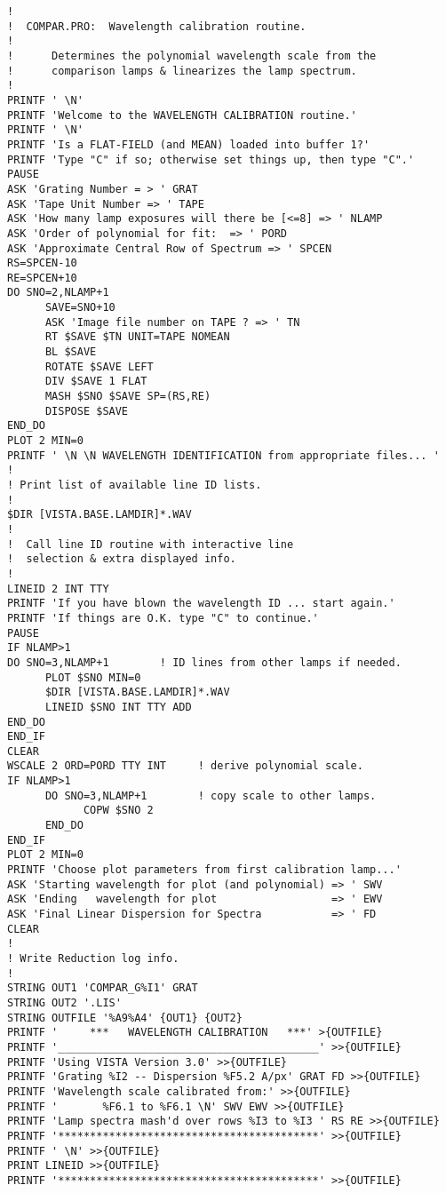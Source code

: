 \begin{verbatim}
!
!  COMPAR.PRO:  Wavelength calibration routine.
!
!      Determines the polynomial wavelength scale from the
!      comparison lamps & linearizes the lamp spectrum.
!
PRINTF ' \N'
PRINTF 'Welcome to the WAVELENGTH CALIBRATION routine.'
PRINTF ' \N'
PRINTF 'Is a FLAT-FIELD (and MEAN) loaded into buffer 1?'
PRINTF 'Type "C" if so; otherwise set things up, then type "C".'
PAUSE
ASK 'Grating Number = > ' GRAT
ASK 'Tape Unit Number => ' TAPE
ASK 'How many lamp exposures will there be [<=8] => ' NLAMP
ASK 'Order of polynomial for fit:  => ' PORD
ASK 'Approximate Central Row of Spectrum => ' SPCEN
RS=SPCEN-10
RE=SPCEN+10
DO SNO=2,NLAMP+1
      SAVE=SNO+10
      ASK 'Image file number on TAPE ? => ' TN
      RT $SAVE $TN UNIT=TAPE NOMEAN
      BL $SAVE
      ROTATE $SAVE LEFT
      DIV $SAVE 1 FLAT
      MASH $SNO $SAVE SP=(RS,RE)
      DISPOSE $SAVE
END_DO
PLOT 2 MIN=0
PRINTF ' \N \N WAVELENGTH IDENTIFICATION from appropriate files... '
!
! Print list of available line ID lists.
!
$DIR [VISTA.BASE.LAMDIR]*.WAV
!
!  Call line ID routine with interactive line
!  selection & extra displayed info.
!
LINEID 2 INT TTY
PRINTF 'If you have blown the wavelength ID ... start again.'
PRINTF 'If things are O.K. type "C" to continue.'
PAUSE
IF NLAMP>1
DO SNO=3,NLAMP+1        ! ID lines from other lamps if needed.
      PLOT $SNO MIN=0
      $DIR [VISTA.BASE.LAMDIR]*.WAV
      LINEID $SNO INT TTY ADD
END_DO
END_IF
CLEAR
WSCALE 2 ORD=PORD TTY INT     ! derive polynomial scale.
IF NLAMP>1
      DO SNO=3,NLAMP+1        ! copy scale to other lamps.
            COPW $SNO 2
      END_DO
END_IF
PLOT 2 MIN=0
PRINTF 'Choose plot parameters from first calibration lamp...'
ASK 'Starting wavelength for plot (and polynomial) => ' SWV
ASK 'Ending   wavelength for plot                  => ' EWV
ASK 'Final Linear Dispersion for Spectra           => ' FD
CLEAR
!
! Write Reduction log info.
!
STRING OUT1 'COMPAR_G%I1' GRAT
STRING OUT2 '.LIS'
STRING OUTFILE '%A9%A4' {OUT1} {OUT2}
PRINTF '     ***   WAVELENGTH CALIBRATION   ***' >{OUTFILE}
PRINTF '_________________________________________' >>{OUTFILE}
PRINTF 'Using VISTA Version 3.0' >>{OUTFILE}
PRINTF 'Grating %I2 -- Dispersion %F5.2 A/px' GRAT FD >>{OUTFILE}
PRINTF 'Wavelength scale calibrated from:' >>{OUTFILE}
PRINTF '       %F6.1 to %F6.1 \N' SWV EWV >>{OUTFILE}
PRINTF 'Lamp spectra mash'd over rows %I3 to %I3 ' RS RE >>{OUTFILE}
PRINTF '*****************************************' >>{OUTFILE}
PRINTF ' \N' >>{OUTFILE}
PRINT LINEID >>{OUTFILE}
PRINTF '*****************************************' >>{OUTFILE}

\end{verbatim}
